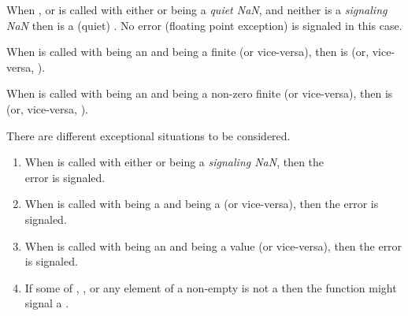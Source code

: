 \documentclass[../Arithmetic-Operations.tex]{subfiles}
\begin{document}
When \code{+}, or \code{*} is called with either  or
 being a \emph{quiet NaN}, and neither is a
\emph{signaling NaN} then  is a (quiet) .
No error (floating point exception) is signaled in this case.

When \code{+} is called with  being an 
 and  being a finite 
(or vice-versa), then  is  (or, vice-versa, 
).

When \code{*} is called with  being an
 and  being a non-zero finite
 (or vice-versa), then  is 
(or, vice-versa, ).

\DExceptional{}

There are different exceptional situations to be considered.

\begin{enumerate}
\item When \code{+} is called with either  or 
  being a \emph{signaling NaN}, then the\\
   error is signaled.

\item When \code{+} is called with  being a
   and  being a
   (or vice-versa), then the
   error is signaled.

\item When \code{*} is called with  being an
   and  being a 
  value (or vice-versa), then the
   error is signaled.

\item If some of , , or any element of a non-empty
   is not a \CL{}  then the function
  might signal a .
\end{enumerate}
\end{document}
